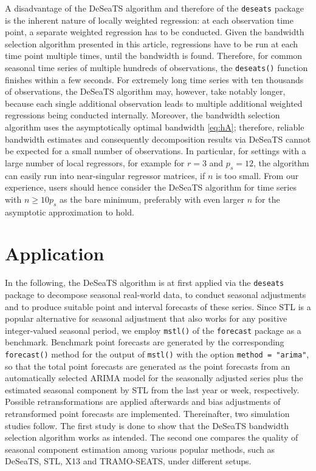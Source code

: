 A disadvantage of the DeSeaTS algorithm and therefore of the \texttt{deseats} package is the inherent nature of locally weighted regression: at each observation time point, a separate weighted regression has to be conducted. Given the bandwidth selection algorithm presented in this article, regressions have to be run at each time point multiple times, until the bandwidth is found. Therefore, for common seasonal time series of multiple hundreds of observations, the \texttt{deseats()} function finishes within a few seconds. For extremely long time series with ten thousands of observations, the DeSeaTS algorithm may, however, take notably longer, because each single additional observation leads to multiple additional weighted regressions being conducted internally. Moreover, the bandwidth selection algorithm uses the asymptotically optimal bandwidth \eqref{eq:hA}; therefore, reliable bandwidth estimates and consequently decomposition results via DeSeaTS cannot be expected for a small number of observations. In particular, for settings with a large number of local regressors, for example for \(r=3\) and \(p_s=12\), the algorithm can easily run into near-singular regressor matrices, if \(n\) is too small. From our experience, users should hence consider the DeSeaTS algorithm for time series with \(n\geq 10p_s\) as the bare minimum, preferably with even larger \(n\) for the asymptotic approximation to hold.

\section{Application}\label{sec:application}

In the following, the DeSeaTS algorithm is at first applied via the \texttt{deseats} package to decompose seasonal real-world data, to conduct seasonal adjustments and to produce suitable point and interval forecasts of these series. Since STL \citep{cleveland1990stl} is a popular alternative for seasonal adjustment that also works for any positive integer-valued seasonal period, we employ \texttt{mstl()} of the \texttt{forecast} package \citep{hyndman2008forecast} as a benchmark. Benchmark point forecasts are generated by the corresponding \texttt{forecast()} method for the output of \texttt{mstl()} with the option \texttt{method\ =\ "arima"}, so that the total point forecasts are generated as the point forecasts from an automatically selected ARIMA model for the seasonally adjusted series plus the estimated seasonal component by STL from the last year or week, respectively. Possible retransformations are applied afterwards and bias adjustments of retransformed point forecasts are implemented. Thereinafter, two simulation studies follow. The first study is done to show that the DeSeaTS bandwidth selection algorithm works as intended. The second one compares the quality of seasonal component estimation among various popular methods, such as DeSeaTS, STL, X13 and TRAMO-SEATS, under different setups.

